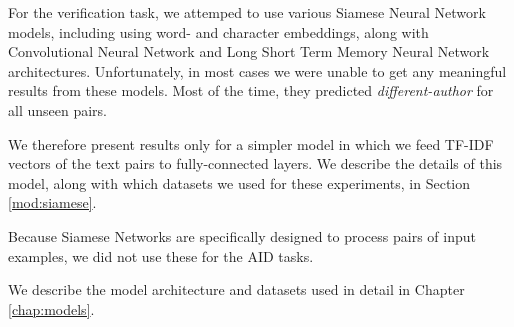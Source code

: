 For the verification task, we attemped to use various Siamese Neural Network models, including using word- and character embeddings, along with Convolutional Neural Network and Long Short Term Memory Neural Network architectures. Unfortunately, in most cases we were unable to get any meaningful results from these models. Most of the time, they predicted \textit{different-author} for all unseen pairs.

We therefore present results only for a simpler model in which we feed TF-IDF vectors of the text pairs to fully-connected layers. We describe the details of this model, along with which datasets we used for these experiments, in Section \ref{mod:siamese}.

Because Siamese Networks are specifically designed to process pairs of input examples, we did not use these for the AID tasks.

We describe the model architecture and datasets used in detail in Chapter \ref{chap:models}.
